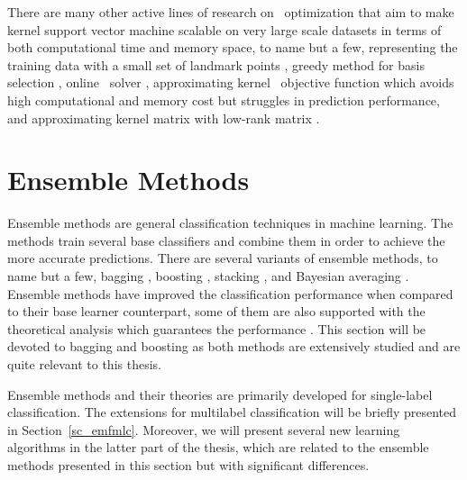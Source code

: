 {There are many other active lines of research on \svm\ optimization that aim to make kernel support vector machine scalable on very large scale datasets in terms of both computational time and memory space, to name but a few, representing the training data with a small set of landmark points \citep{Pavlov00towards,Boley04training,Yu05making,Zhang08improved}, greedy method for basis selection \citep{Keerthi06building}, online \svm\ solver \citep{Bordes05fast}, approximating kernel \svm\ objective function \citep{Zhang12scaling, Le13fast} which avoids high computational and memory cost but struggles in prediction performance, and approximating kernel matrix with low-rank matrix \citep{Smola00sparse,Fine02efficient,Drineas05on,Si14memory}.
\fi


%
%
%
\section{Ensemble Methods} \label{sc_em}

Ensemble methods are general classification techniques in machine learning.
The methods train several base classifiers and combine them in order to achieve the more accurate predictions.
There are several variants of ensemble methods, to name but a few, 
bagging \citep{Breiman96bagging}, 
boosting \citep{Freund97a,Schapire99improved}, 
stacking \citep{Smyth99linearly}, 
and Bayesian averaging \citep{Freund04generalization}.
Ensemble methods have improved the classification performance when compared to their base learner counterpart, some of them are also supported with the theoretical analysis which guarantees the performance \citep{Schapire97boosting,Koltchinskii00empirical,Cortes14semble,Cortes14deep}.
This section will be devoted to bagging and boosting as both methods are extensively studied and are quite relevant to this thesis.

Ensemble methods and their theories are primarily developed for single-label classification.
The extensions for multilabel classification will be briefly presented in Section~\ref{sc_emfmlc}.
Moreover, we will present several new learning algorithms in the latter part of the thesis, which are related to the ensemble methods presented in this section but with significant differences.



}

